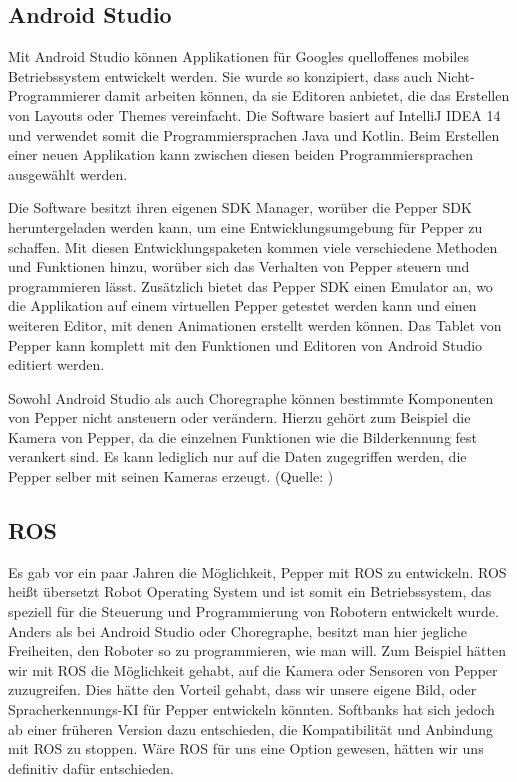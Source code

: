 \subsection{Android Studio}

Mit Android Studio können Applikationen für Googles quelloffenes mobiles Betriebssystem entwickelt werden. Sie wurde so konzipiert, dass 
auch Nicht-Programmierer damit arbeiten können, da sie Editoren anbietet, die das Erstellen von Layouts oder Themes vereinfacht. 
Die Software basiert auf IntelliJ IDEA 14 und verwendet somit die Programmiersprachen Java und Kotlin. Beim Erstellen einer neuen 
Applikation kann zwischen diesen beiden Programmiersprachen ausgewählt werden.

Die Software besitzt ihren eigenen SDK Manager, worüber die Pepper SDK heruntergeladen werden kann, um eine Entwicklungsumgebung für Pepper 
zu schaffen. Mit diesen Entwicklungspaketen kommen viele verschiedene Methoden und Funktionen hinzu, worüber sich das Verhalten von Pepper 
steuern und programmieren lässt. Zusätzlich bietet das Pepper SDK einen Emulator an, wo die Applikation auf einem virtuellen Pepper 
getestet werden kann und einen weiteren Editor, mit denen Animationen erstellt werden können. Das Tablet von Pepper kann komplett mit den 
Funktionen und Editoren von Android Studio editiert werden. 

Sowohl Android Studio als auch Choregraphe können bestimmte Komponenten von Pepper nicht ansteuern oder verändern. Hierzu gehört zum 
Beispiel die Kamera von Pepper, da die einzelnen Funktionen wie die Bilderkennung fest verankert sind. Es kann lediglich nur auf die Daten 
zugegriffen werden, die Pepper selber mit seinen Kameras erzeugt.
(Quelle: \cite{Android_Studio})\\

\subsection{ROS}

Es gab vor ein paar Jahren die Möglichkeit, Pepper mit ROS zu entwickeln. 
ROS heißt übersetzt \glqq Robot Operating System \glqq{} und ist somit ein Betriebssystem, das speziell für die Steuerung und Programmierung 
von Robotern entwickelt wurde. Anders als bei Android Studio oder Choregraphe, besitzt man hier jegliche Freiheiten, den Roboter so zu 
programmieren, wie man will. Zum Beispiel hätten wir mit ROS die Möglichkeit gehabt, auf die Kamera oder Sensoren von Pepper zuzugreifen. 
Dies hätte den Vorteil gehabt, dass wir unsere eigene Bild, oder Spracherkennungs-KI für Pepper entwickeln könnten. Softbanks hat sich 
jedoch ab einer früheren Version dazu entschieden, die Kompatibilität und Anbindung mit ROS zu stoppen. Wäre ROS für uns eine Option 
gewesen, hätten wir uns definitiv dafür entschieden. \\

